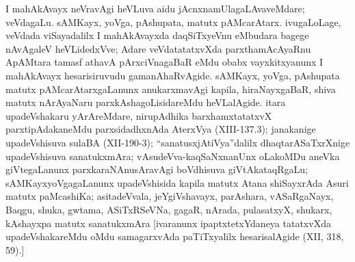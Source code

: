I mahAkAvayx neVravAgi heVLuva aidu jAcnxnamUlagaLAvaveMdare; veVdagaLu. sAMKayx, yoVga, pAshupata, matutx pAMcarAtarx. ivugaLoLage, veVdada viSayadalilx I mahAkAvayxda daqSiTxyeVnu eMbudara bagege nAvAgaleV heVLidedxVve; Adare veVdatatatxvXda parxthamAcAyaRnu ApAMtara tamasf athavA pArxciVnagaBaR eMdu obabx vayxkitxyanunx I mahAkAvayx hesarisiruvudu gamanAhaRvAgide. sAMKayx, yoVga, pAshupata matutx pAMcarAtarxgaLanunx anukarxmavAgi kapila, hiraNayxgaBaR, shiva matutx nArAyaNaru parxkAshagoLisidareMdu heVLalAgide. itara upadeVshakaru yArAreMdare, nirupAdhika barxhamxtatatxvX parxtipAdakaneMdu parxsidadhxnAda AterxVya {\rm(XIII-137.3);} janakanige upadeVshisuva sulaBA {\rm(XII-190-3);} ``sanatusxjAtiVya''dalilx dhaqtarASaTxrXnige upadeVshisuva sanatukxmAra; vAsudeVva-kaqSaNxnanUnx oLakoMDu aneVka giVtegaLanunx parxkaraNAnusAravAgi boVdhisuva giVtAkataqRgaLu; sAMKayxyoVgagaLanunx upadeVshisida kapila matutx Atana shiSayxrAda Asuri matutx paMcashiKa; asitadeVvala, jeYgiVshavayx, parAshara, vASaRgaNayx, Baqgu, shuka, gwtama, ASiTxRSeVNa, gagaR, nArada, pulasatxyX, shukarx, kAshayxpa matutx sanatukxmAra [ivaranunx ipaptxtetxYdaneya tatatxvXda upadeVshakareMdu oMdu samagarxvAda paTiTxyalilx hesarisalAgide {\rm(XII, 318, 59).}]


